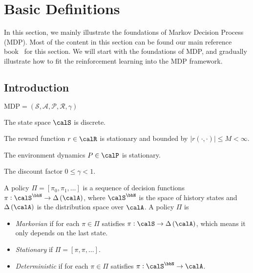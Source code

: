 \section{Basic Definitions}

In this section, we mainly illustrate the foundations of Markov Decision Process (MDP). Most of the content in this section can be found our main reference book~\cite{puterman2014markov} for this section. We will start with the foundations of MDP, and gradually illustrate how to fit the reinforcement learning into the MDP framework.

\subsection{Introduction}

\begin{definition}\label{def:mdp}
    $\mathrm{MDP} = (\mathcal{S}, \mathcal{A}, \mathcal{P}, \mathcal{R}, \gamma)$
\end{definition}

\begin{assumption}\label{asp:discrete-state-space}
    The state space $ \calS $ is discrete.
\end{assumption}
\begin{assumption}
    The reward function $r \in \calR$ is stationary and bounded by $|r(\cdot, \cdot)| \le M < \infty $.
\end{assumption}
\begin{assumption}
    The environment dynamics $P \in \calP$ is stationary.
\end{assumption}
\begin{assumption}
    The discount factor $0 \le \gamma < 1$.
\end{assumption}


\begin{definition}[Policy]\label{def:policy}
    A policy $\Pi=[\pi_0, \pi_1, \dots]$ is a sequence of decision functions  $\pi: \calS^\bbN \to \dist{\calA}$, where $\calS^\bbN$ is the space of history states and $\dist{\calA}$ is the distribution space over $\calA$. A policy $\Pi$ is \begin{itemize}
        \item \emph{Markovian} if for each $\pi \in \Pi$ satisfies $\pi: \calS \to \dist{\calA}$, which means it only depends on the last state.
        \item \emph{Stationary} if $\Pi = [\pi, \pi, \dots]$.
        \item \emph{Deterministic} if for each $\pi \in \Pi$ satisfies $\pi: \calS^\bbN \to \calA$.
    \end{itemize}
    
\end{definition}


